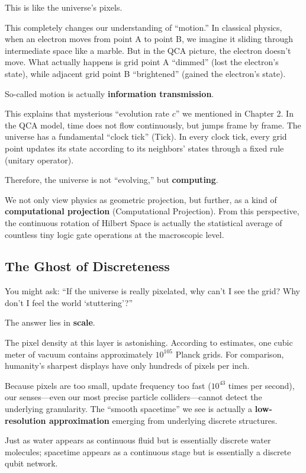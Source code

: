 \documentclass[11pt,a4paper,twoside]{book}
\begin{document}
This is like the universe's pixels.

This completely changes our understanding of ``motion.'' In classical physics, when an electron moves from point A to point B, we imagine it sliding through intermediate space like a marble. But in the QCA picture, the electron doesn't move. What actually happens is grid point A ``dimmed'' (lost the electron's state), while adjacent grid point B ``brightened'' (gained the electron's state).

So-called motion is actually \textbf{information transmission}.

This explains that mysterious ``evolution rate $c$'' we mentioned in Chapter 2. In the QCA model, time does not flow continuously, but jumps frame by frame. The universe has a fundamental ``clock tick'' (Tick). In every clock tick, every grid point updates its state according to its neighbors' states through a fixed rule (unitary operator).

Therefore, the universe is not ``evolving,'' but \textbf{computing}.

We not only view physics as geometric projection, but further, as a kind of \textbf{computational projection} (Computational Projection). From this perspective, the continuous rotation of Hilbert Space is actually the statistical average of countless tiny logic gate operations at the macroscopic level.

\subsection{The Ghost of Discreteness}

You might ask: ``If the universe is really pixelated, why can't I see the grid? Why don't I feel the world `stuttering'?''

The answer lies in \textbf{scale}.

The pixel density at this layer is astonishing. According to estimates, one cubic meter of vacuum contains approximately $10^{105}$ Planck grids. For comparison, humanity's sharpest displays have only hundreds of pixels per inch.

Because pixels are too small, update frequency too fast ($10^{43}$ times per second), our senses---even our most precise particle colliders---cannot detect the underlying granularity. The ``smooth spacetime'' we see is actually a \textbf{low-resolution approximation} emerging from underlying discrete structures.

Just as water appears as continuous fluid but is essentially discrete water molecules; spacetime appears as a continuous stage but is essentially a discrete qubit network.
\end{document}

